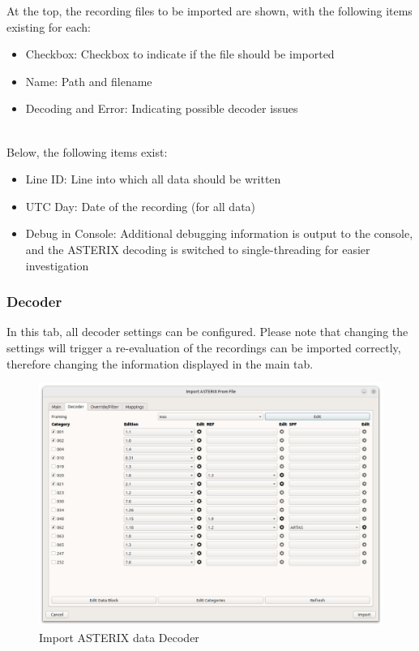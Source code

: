 At the top, the recording files to be imported are shown, with the following items existing for each:
\begin{itemize}
\item Checkbox: Checkbox to indicate if the file should be imported
\item Name: Path and filename
\item Decoding and Error: Indicating possible decoder issues
\end{itemize}
\ \\

Below, the following items exist:
\begin{itemize}
\item Line ID: Line into which all data should be written
\item UTC Day: Date of the recording (for all data)
\item Debug in Console: Additional debugging information is output to the console, and the ASTERIX decoding is switched to single-threading for easier investigation \\
\end{itemize}

\subsubsection{Decoder}

In this tab, all decoder settings can be configured. Please note that changing the settings will trigger a re-evaluation of the recordings can be imported correctly, therefore changing the information displayed in the main tab.

\begin{figure}[H]
  \center
    \hspace*{-0.5cm}
    \includegraphics[width=17cm]{figures/asterix_import_data_decoder.png}
  \caption{Import ASTERIX data Decoder}
\end{figure}

